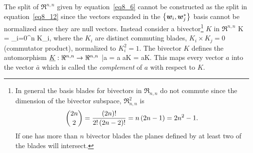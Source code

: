 The split of $\Re^{n,n}$ given by equation~\ref{eq8_6} cannot be constructed as the split in equation~\ref{eq8_12} since 
the vectors expanded in the $\left \{ {\bm{w}_{i},\bm{w}_{j}^{*}} \right \}$ basis cannot be normalized since they are null vectors. Instead
consider a bivector\footnote{In general the basis blades for bivectors in $\Re_{n,n}$ do not commute since
the dimension of the bivector subspace, $\Re_{n,n}^{2}$ is 
\begin{equation*}
	\binom{2n}{2} = \frac{\left ( {2n} \right )!}{2!\left ( {2n-2} \right )!} = n\left ( {2n-1} \right ) = 2n^{2}-1.
\end{equation*}
If one has more than $n$ bivector blades the planes defined by at least two of the blades will intersect.} $K$ in $\Re^{n,n}$
\be
	K = \sum_{i=0}^{n} K_{i},\label{eq8_22}
\ee
where the $K_{i}$ are distinct commuting blades, $K_{i}\times K_{j} = 0$ (commutator product), normalized to $K_{i}^{2}=1$.  
The bivector $K$ defines
the automorphism $\underline{K}:\Re^{n,n}\rightarrow\Re^{n,n}$
\be
	\bar{a} = a \equiv a\times K = a\cdot K.
\ee
This maps every vector $a$ into the vector $\bar{a}$ which is called the {\em complement} of $a$ with respect to $K$.

